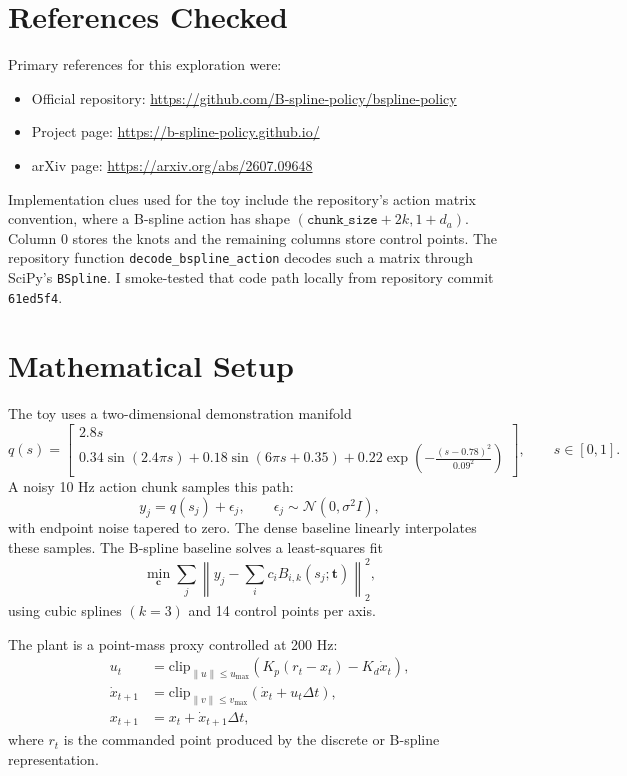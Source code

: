 \documentclass[11pt]{article}
\begin{document}
\section{References Checked}

Primary references for this exploration were:
\begin{itemize}[leftmargin=1.5em]
  \item Official repository: \url{https://github.com/B-spline-policy/bspline-policy}
  \item Project page: \url{https://b-spline-policy.github.io/}
  \item arXiv page: \url{https://arxiv.org/abs/2607.09648}
\end{itemize}

Implementation clues used for the toy include the repository's action matrix convention, where a B-spline action has shape \((\texttt{chunk\_size} + 2k, 1 + d_a)\). Column 0 stores the knots and the remaining columns store control points. The repository function \texttt{decode\_bspline\_action} decodes such a matrix through SciPy's \texttt{BSpline}. I smoke-tested that code path locally from repository commit \texttt{61ed5f4}.

\section{Mathematical Setup}

The toy uses a two-dimensional demonstration manifold
\[
  q(s) = \begin{bmatrix}
    2.8s \\
    0.34\sin(2.4\pi s) + 0.18\sin(6\pi s + 0.35) + 0.22\exp\left(-\frac{(s - 0.78)^2}{0.09^2}\right)
  \end{bmatrix},
  \qquad s \in [0,1].
\]
A noisy 10 Hz action chunk samples this path:
\[
  y_j = q(s_j) + \epsilon_j, \qquad \epsilon_j \sim \mathcal{N}(0, \sigma^2 I),
\]
with endpoint noise tapered to zero. The dense baseline linearly interpolates these samples. The B-spline baseline solves a least-squares fit
\[
  \min_{\mathbf{c}} \sum_j \left\| y_j - \sum_i c_i B_{i,k}(s_j; \mathbf{t}) \right\|_2^2,
\]
using cubic splines \((k=3)\) and 14 control points per axis.

The plant is a point-mass proxy controlled at 200 Hz:
\begin{align*}
  u_t &= \mathrm{clip}_{\|u\| \leq u_{\max}}\left(K_p(r_t - x_t) - K_d \dot{x}_t\right), \\
  \dot{x}_{t+1} &= \mathrm{clip}_{\|v\| \leq v_{\max}}(\dot{x}_t + u_t \Delta t), \\
  x_{t+1} &= x_t + \dot{x}_{t+1}\Delta t,
\end{align*}
where \(r_t\) is the commanded point produced by the discrete or B-spline representation.
\end{document}
